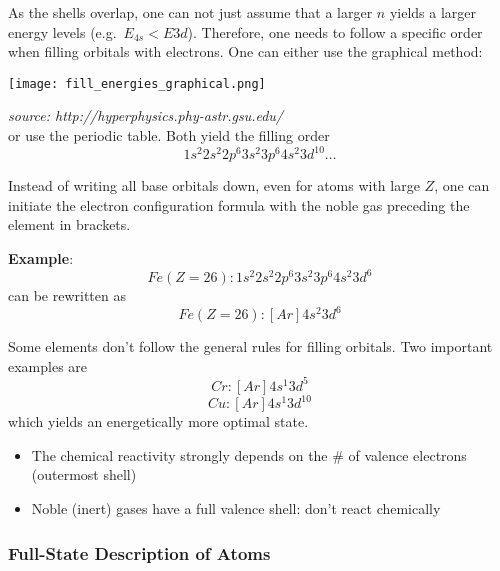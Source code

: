 
As the shells overlap, one can not just assume that a larger $n$ yields a larger energy levels (e.g.\ $E_{4s}<E{3d}$). Therefore, one needs to follow a specific order when filling orbitals with electrons. One can either use the graphical method:
\begin{center}
    \texttt{[image: fill\_energies\_graphical.png]}
\end{center}
\textit{source: http://hyperphysics.phy-astr.gsu.edu/}\\
or use the periodic table. Both yield the filling order
\begin{equation*}
    1s^2 2s^2 2p^6 3s^2 3p^6 4s^2 3d^{10}\dots
\end{equation*}


Instead of writing all base orbitals down, even for atoms with large $Z$, one can initiate the electron configuration formula with the noble gas preceding the element in brackets.

\newpar{}
\textbf{Example}:
\begin{equation*}
    Fe(Z=26): 1s^2 2s^2 2p^6 3s^2 3p^6 4s^2 3d^6
\end{equation*}
can be rewritten as
\begin{equation*}
    Fe(Z=26): \left[Ar\right]4s^2 3d^6
\end{equation*}


Some elements don't follow the general rules for filling orbitals. Two important examples are
\begin{equation*}
    Cr: \left[Ar\right]4s^1 3d^5
\end{equation*}
\begin{equation*}
    Cu: \left[Ar\right]4s^1 3d^{10}
\end{equation*}
which yields an energetically more optimal state.


\begin{itemize}
    \item The chemical reactivity strongly depends on the \# of valence electrons (outermost shell)
    \item Noble (inert) gases have a full valence shell: don't react chemically
\end{itemize}

\subsubsection{Full-State Description of Atoms}

